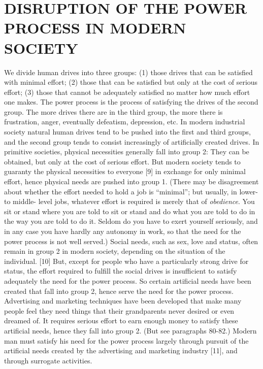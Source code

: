 \chapter{DISRUPTION OF THE POWER PROCESS IN MODERN SOCIETY}

 We divide human drives into three groups: (1) those drives that can be satisfied with minimal effort; (2) those that can be satisfied but only at the cost of serious effort; (3) those that cannot be adequately satisfied no matter how much effort one makes. The power process is the process of satisfying the drives of the second group. The more drives there are in the third group, the more there is frustration, anger, eventually defeatism, depression, etc.
 In modern industrial society natural human drives tend to be pushed into the first and third groups, and the second group tends to consist increasingly of artificially created drives.
 In primitive societies, physical necessities generally fall into group 2: They can be obtained, but only at the cost of serious effort. But modern society tends to guaranty the physical necessities to everyone [9] in exchange for only minimal effort, hence physical needs are pushed into group 1. (There may be disagreement about whether the effort needed to hold a job is “minimal”; but usually, in lower- to middle- level jobs, whatever effort is required is merely that of {\em obedience}. You sit or stand where you are told to sit or stand and do what you are told to do in the way you are told to do it. Seldom do you have to exert yourself seriously, and in any case you have hardly any autonomy in work, so that the need for the power process is not well served.)
 Social needs, such as sex, love and status, often remain in group 2 in modern society, depending on the situation of the individual. [10] But, except for people who have a particularly strong drive for status, the effort required to fulfill the social drives is insufficient to satisfy adequately the need for the power process.
 So certain artificial needs have been created that fall into group 2, hence serve the need for the power process. Advertising and marketing techniques have been developed that make many people feel they need things that their grandparents never desired or even dreamed of. It requires serious effort to earn enough money to satisfy these artificial needs, hence they fall into group 2. (But see paragraphs 80-82.) Modern man must satisfy his need for the power process largely through pursuit of the artificial needs created by the advertising and marketing industry [11], and through surrogate activities.
